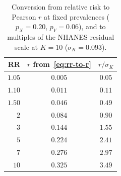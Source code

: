 \begin{table}[h]
\centering
\caption{Conversion from relative risk to Pearson $r$ at fixed prevalences ($p_X=0.20$, $p_Y=0.06$), and to multiples of the NHANES residual scale at $K=10$ ($\sigma_K=0.093$).}
\label{tab:rr-to-r}
\begin{tabular}{rcc}
\toprule
RR & $r$ from~\eqref{eq:rr-to-r} & $r/\sigma_K$ \\
\midrule
$1.05$ & $0.005$ & $0.05$ \\
$1.10$ & $0.011$ & $0.11$ \\
$1.50$ & $0.046$ & $0.49$ \\
$2$    & $0.084$ & $0.90$ \\
$3$    & $0.144$ & $1.55$ \\
$5$    & $0.224$ & $2.41$ \\
$7$    & $0.276$ & $2.97$ \\
$10$   & $0.325$ & $3.49$ \\
\bottomrule
\end{tabular}
\end{table}

